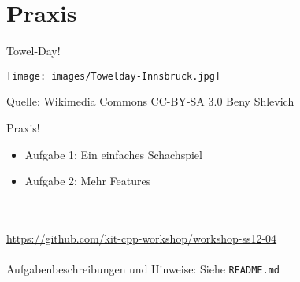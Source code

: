 \section{Praxis}

\begin{frame}{Towel-Day!}
	\begin{center}
		\texttt{[image: images/Towelday-Innsbruck.jpg]}
	\end{center}
	
	\scriptsize
	\raisebox{4em}
	{
		Quelle: Wikimedia Commons
		CC-BY-SA 3.0 Beny Shlevich
	}
\end{frame}

\begin{frame}[fragile]{Praxis!}
	\begin{itemize}
		\item Aufgabe 1: Ein einfaches Schachspiel
		\item Aufgabe 2: Mehr Features
	\end{itemize}
	\ \\
	\ \\
	\large{\url{https://github.com/kit-cpp-workshop/workshop-ss12-04}} \\
	\ \\
	Aufgabenbeschreibungen und Hinweise: Siehe \verb|README.md|

\end{frame}
